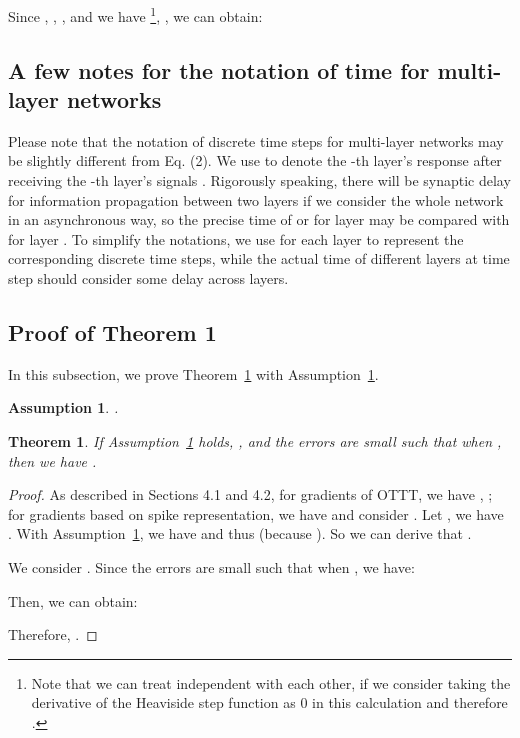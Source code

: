 \documentclass{article}
\begin{document}
Since , , , and we have \footnote{Note that we can treat  independent with each other, if we consider taking the derivative of the Heaviside step function as 0 in this calculation and therefore .}, , we can obtain:



\subsection{A few notes for the notation of time for multi-layer networks}

Please note that the notation of discrete time steps for multi-layer networks may be slightly different from Eq. (2). We use  to denote the -th layer’s response after receiving the -th layer’s signals . Rigorously speaking, there will be synaptic delay  for information propagation between two layers if we consider the whole network in an asynchronous way, so the precise time of  or  for layer  may be  compared with  for layer . To simplify the notations, we use  for each layer to represent the corresponding discrete time steps, while the actual time of different layers at time step  should consider some delay across layers.


\subsection{Proof of Theorem 1}

In this subsection, we prove Theorem~\ref{supthm_feedforward} with Assumption~\ref{supassumption1}.

\newtheorem{supassumption}{\bf Assumption}
\begin{supassumption}\label{supassumption1}
.
\end{supassumption}

\newtheorem{supthm}{\bf Theorem}
\begin{supthm}\label{supthm_feedforward}
If Assumption~\ref{supassumption1} holds, , and the errors  are small such that  when , then we have .
\end{supthm}

\begin{proof}

As described in Sections 4.1 and 4.2, for gradients of OTTT, we have , ; for gradients based on spike representation, we have  and consider . Let , we have . With Assumption~\ref{supassumption1}, we have  and thus  (because ). So we can derive that .

We consider . Since the errors  are small such that  when , we have:


Then, we can obtain:


Therefore, .

\end{proof}
\end{document}
